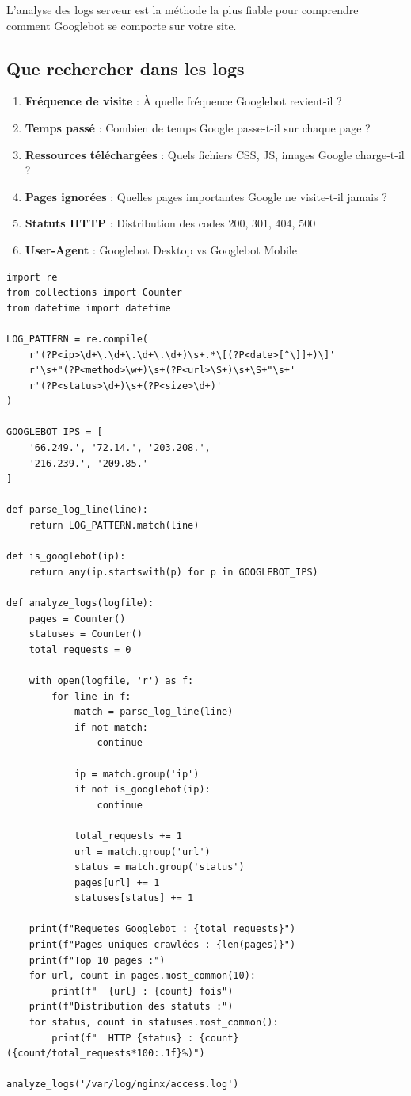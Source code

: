 \documentclass[12pt,a4paper,twoside]{report}
\begin{document}
L'analyse des logs serveur est la méthode la plus fiable pour comprendre comment Googlebot se comporte sur votre site.

\subsection{Que rechercher dans les logs}

\begin{enumerate}
    \item \textbf{Fréquence de visite} : À quelle fréquence Googlebot revient-il ?
    \item \textbf{Temps passé} : Combien de temps Google passe-t-il sur chaque page ?
    \item \textbf{Ressources téléchargées} : Quels fichiers CSS, JS, images Google charge-t-il ?
    \item \textbf{Pages ignorées} : Quelles pages importantes Google ne visite-t-il jamais ?
    \item \textbf{Statuts HTTP} : Distribution des codes 200, 301, 404, 500
    \item \textbf{User-Agent} : Googlebot Desktop vs Googlebot Mobile
\end{enumerate}

\begin{lstlisting}[style=code,caption={Script Python pour analyser le comportement de Googlebot dans les logs}]
import re
from collections import Counter
from datetime import datetime

LOG_PATTERN = re.compile(
    r'(?P<ip>\d+\.\d+\.\d+\.\d+)\s+.*\[(?P<date>[^\]]+)\]'
    r'\s+"(?P<method>\w+)\s+(?P<url>\S+)\s+\S+"\s+'
    r'(?P<status>\d+)\s+(?P<size>\d+)'
)

GOOGLEBOT_IPS = [
    '66.249.', '72.14.', '203.208.',
    '216.239.', '209.85.'
]

def parse_log_line(line):
    return LOG_PATTERN.match(line)

def is_googlebot(ip):
    return any(ip.startswith(p) for p in GOOGLEBOT_IPS)

def analyze_logs(logfile):
    pages = Counter()
    statuses = Counter()
    total_requests = 0

    with open(logfile, 'r') as f:
        for line in f:
            match = parse_log_line(line)
            if not match:
                continue

            ip = match.group('ip')
            if not is_googlebot(ip):
                continue

            total_requests += 1
            url = match.group('url')
            status = match.group('status')
            pages[url] += 1
            statuses[status] += 1

    print(f"Requetes Googlebot : {total_requests}")
    print(f"Pages uniques crawlées : {len(pages)}")
    print(f"Top 10 pages :")
    for url, count in pages.most_common(10):
        print(f"  {url} : {count} fois")
    print(f"Distribution des statuts :")
    for status, count in statuses.most_common():
        print(f"  HTTP {status} : {count} ({count/total_requests*100:.1f}%)")

analyze_logs('/var/log/nginx/access.log')
\end{lstlisting}
\end{document}
